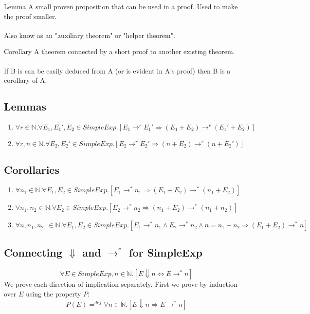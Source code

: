 \begin{definitionbox}{Lemma}
	A small proven proposition that can be used in a proof. Used to make the proof smaller.
	\\
	\\ Also know as an "auxiliary theorem" or "helper theorem".
\end{definitionbox}
\begin{definitionbox}{Corollary}
	A theorem connected by a short proof to another existing theorem.
	\\
	\\ If B is can be easily deduced from A (or is evident in A's proof) then B is a corollary of A.
\end{definitionbox}
\subsection{Lemmas}
\begin{enumerate}
	\item $\forall r \in \mathbb{N}. \forall E_1,E_1',E_2 \in SimpleExp. [E_1 \to^r E_1' \Rightarrow (E_1 + E_2) \to^r (E_1' + E_2)]$
	\item $\forall r,n \in \mathbb{N}. \forall E_2,E_2' \in SimpleExp . [E_2 \to^r E_2' \Rightarrow (n + E_2) \to^r (n + E_2')]$
\end{enumerate}
\subsection{Corollaries}
\begin{enumerate}
	\item $\forall n_1 \in \mathbb{N} . \forall E_1, E_2 \in SimpleExp . [E_1 \to^* n_1 \Rightarrow (E_1 + E_2) \to^* (n_1 + E_2)]$
	\item $\forall n_1, n_2 \in \mathbb{N} . \forall E_2 \in SimpleExp . [E_2 \to^* n_2 \Rightarrow (n_1 + E_2) \to^* (n_1 + n_2)]$
	\item $\forall n,n_1, n_2, \in \mathbb{N} . \forall E_1, E_2 \in SimpleExp . [E_1 \to^* n_1 \land E_2 \to^* n_2 \land n = n_1 + n_2 \Rightarrow (E_1 + E_2) \to^* n]$
\end{enumerate}

\subsection{Connecting $\Downarrow$ and $\to^*$ for SimpleExp}
\[\forall E \in SimpleExp, n \in \mathbb{N}.[E \Downarrow n \Leftrightarrow E \to^* n]\]
We prove each direction of implication separately. First we prove by induction over $E$ using the property $P$:
\[P(E) =^{def} \forall n \in \mathbb{N}.[E \Downarrow n \Rightarrow E \to^* n]\]
